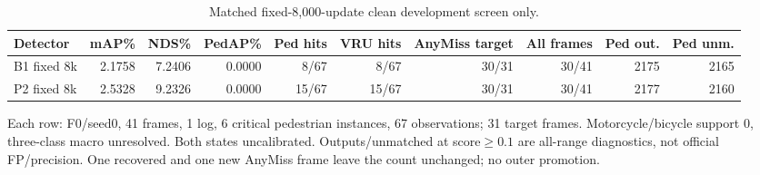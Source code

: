\begin{table}[t]
\centering\footnotesize
\caption{Matched fixed-8,000-update clean development screen only.}\label{tab:p}
\setlength{\tabcolsep}{3pt}
\begin{tabular}{lrrrrrrrrr}\toprule
Detector & mAP\% & NDS\% & PedAP\% & Ped hits & VRU hits & AnyMiss target & All frames & Ped out. & Ped unm.\\\midrule
B1 fixed 8k & 2.1758 & 7.2406 & 0.0000 & 8/67 & 8/67 & 30/31 & 30/41 & 2175 & 2165\\
P2 fixed 8k & 2.5328 & 9.2326 & 0.0000 & 15/67 & 15/67 & 30/31 & 30/41 & 2177 & 2160\\
\bottomrule\end{tabular}
\par\vspace{3pt}\begin{minipage}{0.98\textwidth}\footnotesize Each row: F0/seed0, 41 frames, 1 log, 6 critical pedestrian instances, 67 observations; 31 target frames. Motorcycle/bicycle support 0, three-class macro unresolved. Both states uncalibrated. Outputs/unmatched at score$\geq0.1$ are all-range diagnostics, not official FP/precision. One recovered and one new AnyMiss frame leave the count unchanged; no outer promotion.\end{minipage}
\end{table}
